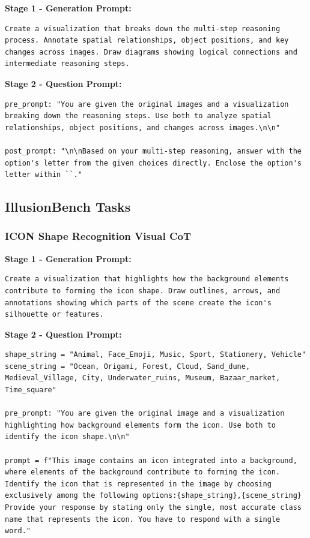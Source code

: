 \documentclass{article}
\theoremstyle{plain}
\theoremstyle{definition}
\theoremstyle{remark}
\begin{document}
\textbf{Stage 1 - Generation Prompt:}

\begin{verbatim}
Create a visualization that breaks down the multi-step reasoning
process. Annotate spatial relationships, object positions, and key
changes across images. Draw diagrams showing logical connections and
intermediate reasoning steps.
\end{verbatim}

\textbf{Stage 2 - Question Prompt:}

\begin{verbatim}
pre_prompt: "You are given the original images and a visualization
breaking down the reasoning steps. Use both to analyze spatial
relationships, object positions, and changes across images.\n\n"

post_prompt: "\n\nBased on your multi-step reasoning, answer with the
option's letter from the given choices directly. Enclose the option's
letter within ``."
\end{verbatim}

\subsection{IllusionBench Tasks}

\subsubsection{ICON Shape Recognition Visual CoT}

\textbf{Stage 1 - Generation Prompt:}

\begin{verbatim}
Create a visualization that highlights how the background elements
contribute to forming the icon shape. Draw outlines, arrows, and
annotations showing which parts of the scene create the icon's
silhouette or features.
\end{verbatim}

\textbf{Stage 2 - Question Prompt:}

\begin{verbatim}
shape_string = "Animal, Face_Emoji, Music, Sport, Stationery, Vehicle"
scene_string = "Ocean, Origami, Forest, Cloud, Sand_dune,
Medieval_Village, City, Underwater_ruins, Museum, Bazaar_market,
Time_square"

pre_prompt: "You are given the original image and a visualization
highlighting how background elements form the icon. Use both to
identify the icon shape.\n\n"

prompt = f"This image contains an icon integrated into a background,
where elements of the background contribute to forming the icon.
Identify the icon that is represented in the image by choosing
exclusively among the following options:{shape_string},{scene_string}
Provide your response by stating only the single, most accurate class
name that represents the icon. You have to respond with a single word."
\end{verbatim}
\end{document}
